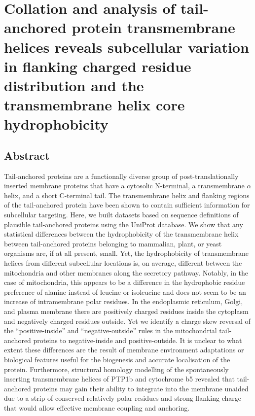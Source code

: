 \chapter{Collation and analysis of tail-anchored protein transmembrane helices reveals subcellular variation in flanking charged residue distribution and the transmembrane helix core hydrophobicity}

\sloppy

\section{Abstract}

Tail\--anchored proteins are a functionally diverse group of post\--translationally inserted membrane proteins that have a cytosolic N-terminal, a transmembrane $\alpha$ helix, and a short C\--terminal tail.
The transmembrane helix and flanking regions of the tail\--anchored protein have been shown to contain sufficient information for subcellular targeting.
Here, we built datasets based on sequence definitions of plausible tail\--anchored proteins using the  UniProt database.
We show that any statistical differences between the hydrophobicity of the transmembrane helix between tail\--anchored proteins belonging to mammalian, plant, or yeast organisms are, if at all present, small.
Yet, the hydrophobicity of transmembrane helices from different subcellular locations is, on average, different between the mitochondria and other membranes along the secretory pathway.
Notably, in the case of mitochondria, this appears to be a difference in the hydrophobic residue preference of alanine instead of leucine or isoleucine and does not seem to be an increase of intramembrane polar residues.
In the endoplasmic reticulum, Golgi, and plasma membrane there are positively charged residues inside the cytoplasm and negatively charged residues outside.
Yet we identify a charge skew reversal of the ``positive\--inside'' and ``negative\--outside'' rules in the mitochondrial tail\--anchored proteins to negative\--inside and positive\--outside.
It is unclear to what extent these differences are the result of membrane environment adaptations or biological features useful for the biogenesis and accurate localisation of the protein.
Furthermore, structural homology modelling of the spontaneously inserting transmembrane helices of PTP1b and cytochrome b5 revealed that tail\--anchored proteins may gain their ability to integrate into the membrane unaided due to a strip of conserved relatively polar residues and strong flanking charge that would allow effective membrane coupling and anchoring.

